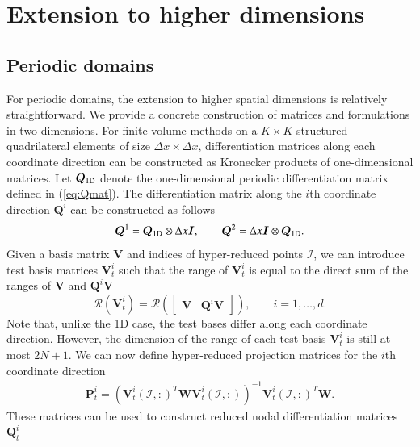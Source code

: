 \documentclass[preprint,10pt]{elsarticle}
\theoremstyle{definition}
\theoremstyle{lemma}
\theoremstyle{theorem}
\theoremstyle{assumption}
\newcommand{\LRp}[1]{\left( #1 \right)}
\begin{document}
\section{Extension to higher dimensions}
\label{sec:7}

\subsection{Periodic domains}
For periodic domains, the extension to higher spatial dimensions is relatively straightforward.  We provide a concrete construction of matrices and formulations in two dimensions.  For finite volume methods on a $K \times K$ structured quadrilateral elements of size $\Delta x \times \Delta x$, differentiation matrices along each coordinate direction can be constructed as Kronecker products of one-dimensional matrices.  Let $\bm{Q}_{\rm 1D}$ denote the one-dimensional periodic differentiation matrix defined in (\ref{eq:Qmat}).  The differentiation matrix along the $i$th coordinate direction $\bm{Q}^i$ can be constructed as follows
\[
\bm{Q}^1 = \bm{Q}_{\rm 1D}\otimes \Delta x \bm{I}, \qquad \bm{Q}^2 = \Delta x\bm{I} \otimes \bm{Q}_{\rm 1D}.
\]
Given a basis matrix $\bm{V}$ and indices of hyper-reduced points $\mathcal{I}$, we can introduce test basis matrices $\bm{V}^i_t$ such that the range of  $\bm{V}^i_t$ is equal to the direct sum of the ranges of $\bm{V}$ and $\bm{Q}^i\bm{V}$
\[
\mathcal{R}\LRp{\bm{V}^i_t} = \mathcal{R}\LRp{\begin{bmatrix}\bm{V} &\bm{Q}^i\bm{V}\end{bmatrix}}, \qquad i = 1,\ldots,d.
\]
Note that, unlike the 1D case, the test bases differ along each coordinate direction.  However, the dimension of the range of each test basis $\bm{V}_t^i$ is still at most $2N+1$.  
We can now define hyper-reduced projection matrices for the $i$th coordinate direction
\begin{align*}
\bm{P}^i_t = \LRp{\bm{V}^i_t\LRp{\mathcal{I},:}^T\bm{W}\bm{V}^i_t\LRp{\mathcal{I},:}}^{-1}\bm{V}^i_t\LRp{\mathcal{I},:}^T\bm{W}.%
\end{align*}
These matrices can be used to construct reduced nodal differentiation matrices $\bm{Q}_t^i$ %
\end{document}

